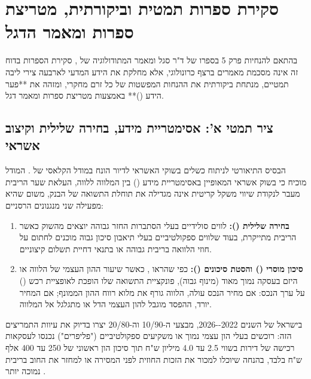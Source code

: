 \section{סקירת ספרות תמטית וביקורתית, מטריצת ספרות ומאמר הדגל}
\label{sec:ch01_literature}

בהתאם להנחיות פרק \num{5} בספרו של ד"ר סגל \cite{segal2026prep} ומאמר המתודולוגיה של  \cite{webster2002analyzing}, סקירת הספרות בדוח זה אינה מסכמת מאמרים ברצף כרונולוגי, אלא מחלקת את הידע המדעי לארבעה צירי ליבה תמטיים, מנתחת ביקורתית את ההנחות המפשטות של כל זרם מחקרי, ומזהה את **פער הידע ()** באמצעות מטריצת ספרות ומאמר דגל.

\subsection{ציר תמטי א': אסימטריית מידע, בחירה שלילית וקיצוב אשראי}
הבסיס התיאורטי לניתוח כשלים בשוקי האשראי לדיור הונח במודל הקלאסי של  \cite{stiglitz1981credit}. המודל מוכיח כי בשוק אשראי המאופיין באסימטריית מידע () בין המלווה ללווה, העלאת שער הריבית מעבר לנקודת שיווי משקל קריטית אינה מגדילה את תוחלת התשואה של הבנק, משום שהיא מפעילה שני מנגנונים הרסניים:
\begin{enumerate}[leftmargin=*, itemsep=2pt]
  \item \textbf{בחירה שלילית ():} לווים סולידיים בעלי הסתברות החזר גבוהה יוצאים מהשוק כאשר הריבית מתייקרת, בעוד שלווים ספקולטיביים בעלי תיאבון סיכון גבוה מוכנים לחתום על חוזי הלוואה בריבית גבוהה או בתנאי דחיית תשלום קיצוניים.
  \item \textbf{סיכון מוסרי () והסטת סיכונים ():} כפי שהראו  \cite{jensen1976theory}, כאשר שיעור ההון העצמי של הלווה או היזם בעסקה נמוך מאוד (מינוף גבוה), פונקציית התשואה שלו הופכת לאופציית רכש () על ערך הנכס: אם מחיר הנכס עולה, הלווה גורף את מלוא רווח ההון הממונף; אם המחיר יורד, ההפסד מוגבל להון העצמי הדל או מתגלגל אל המלווה.
\end{enumerate}
בישראל של השנים \num{2022--2026}, מבצעי ה-\num{10/90} וה-\num{20/80} יצרו בדיוק את עיוות התמריצים הזה: רוכשים בעלי הון עצמי נמוך או משקיעים ספקולטיביים ("פליפרים") נכנסו לעסקאות רכישה של דירות בשווי \num{2.5} עד \num{4.0} מיליון ש"ח תוך סיכון הון ראשוני של \num{250} עד \num{400} אלף ש"ח בלבד, בהנחה שיוכלו למכור את הזכות החוזית לפני המסירה או למחזר את החוב בריבית נמוכה יותר \cite{boi2025stability,mof2025economist}.


